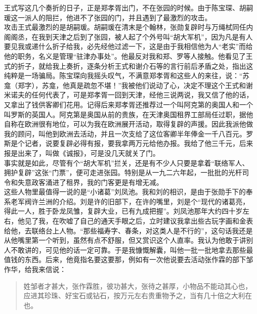 王式写这几个奏折的日子，正是郑孝胥出门，不在张园的时候。由于陈宝琛、胡嗣瑗这一派人的阻拦，他进不了张园的门，并且遇到了最激烈的攻击。\\

攻击王式最激烈的是胡嗣瑗。胡嗣瑗在清末是个翰林，张勋复辟时与万绳栻同任内阁阁丞，在我到天津之后到了张园，被人起了个外号叫“胡大军机”，因为凡是有人要见我或递什么折子给我，必先经他过滤一下，这是由于我相信他为人“老实”而给他的职务，名义是管理“驻津办事处”。他最反对我和郑、罗等人接触。他看见了王式的折子，就给我上奏折，逐条分析王式和谢介石等的言行前后矛盾之处，指出这纯粹是一场骗局。陈宝琛向我摇头叹气，不满意郑孝胥和这些人的来往，说：“苏龛（郑字），苏龛，他真是疏忽不堪！”我被他们说动了心，决定不理这个王式和谢米诺夫的任何代表了，可是郑孝胥一回到天津，经他三说两说，我又信了他的话，又拿出了钱供客卿们花用。记得后来郑孝胥还推荐过一个叫阿克第的奥国人和一个叫罗斯的英国人。阿克第是奥国从前的贵族，在天津奥国租界工部局任过职，据他自称在欧洲很有地位，可以为我在欧洲展开活动，取得复辟的声援。因此我派他做我的顾问，叫他到欧洲去活动，并且一次支给了这位客卿半年俸金一千八百元。罗斯是个记者，说要复辟必得有报，要我拿两万元给他办报。我给了他三千元，后来报是出来了，叫做《诚报》，可是没几天就关了门。\\

事实就是如此，尽管有个“胡大军机”拦关，还是有不少人只要是拿着“联络军人、拥护复辟”这张“门票”，便可走进张园。特别是从一九二六年起，一批批的光杆司令和失意政客涌进了租界，我的门客更是有增无减。\\

这些人物里最值得一说的是“小诸葛”刘凤池。我和刘的相识，是由于张勋手下的奉系老军阀许兰洲的介绍。刘是许的旧部下，在许的嘴里，刘是个“现代的诸葛亮，得此一人，胜于卧龙凤雏，复辟大业，已有九成把握”。刘凤池那年大约四十岁左右，他见了我，在吹嘘了自己的通天手眼之后，立时建议我拿出些古玩字画和金表给他，去联络台上人物。“那些福寿字、春条，对这类人是不行的”，这句话我还是从他嘴里第一个听到，虽然有点不舒服，但又赏识这个人直率。我认为他敢于讲别人不敢讲的，可见他的话一定可靠。于是我慷慨解囊，叫他一批一批地拿去那些最值钱的东西。后来，他竟指名要这要那，例如有一次他说要去活动张作霖的部下邹作华，给我来信说：\\

\begin{quote}
	姓邹者才甚大，张作霖胜，彼功甚大，张待之甚厚，小物品不能动其心也，应进其珍珠、好宝石或钻石，按万元左右贵重物予之，当有几十倍之大利在也。\\
\end{quote}

